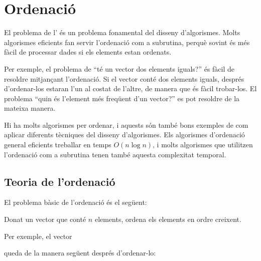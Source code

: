 \chapter{Ordenació}

El problema de l'
és un problema fonamental del disseny d'algorismes.
Molts algorismes eficients
fan servir l'ordenació com a subrutina,
perquè sovint és més fàcil de processar
dades si els elements estan ordenats.

Per exemple, el problema de ``té un vector dos elements iguals?'' és
fàcil de resoldre mitjançant l'ordenació.  Si el vector conté dos
elements iguals, després d'ordenar-los estaran l'un al costat de
l'altre, de manera que és fàcil trobar-los.  El problema ``quin és
l'element més freqüent d'un vector?'' es pot resoldre de la mateixa
manera.

Hi ha molts algorismes per ordenar, i aquests són
també bons exemples de com aplicar
diferents tècniques del disseny d'algorismes.
Els algorismes d'ordenació general eficients
treballar en temps $O(n \log n)$,
i molts algorismes que utilitzen l'ordenació
com a subrutina tenen també aquesta complexitat temporal.

\section{Teoria de l'ordenació}

El problema bàsic de l'ordenació és el següent:
\begin{framed}
\noindent
Donat un vector que conté $n$ elements,
ordena els elements en ordre creixent.
\end{framed}
\noindent
Per exemple, el vector
\begin{center}
\end{center}
queda de la manera següent després d'ordenar-lo:
\begin{center}
\end{center}

